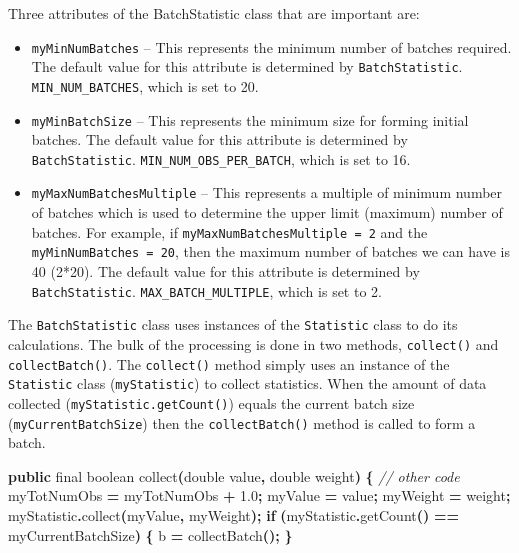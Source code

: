 \documentclass[
]{book}
\newenvironment{Shaded}{\begin{snugshade}}{\end{snugshade}}
\newcommand{\CommentTok}[1]{\textcolor[rgb]{0.56,0.35,0.01}{\textit{#1}}}
\newcommand{\ControlFlowTok}[1]{\textcolor[rgb]{0.13,0.29,0.53}{\textbf{#1}}}
\newcommand{\DataTypeTok}[1]{\textcolor[rgb]{0.13,0.29,0.53}{#1}}
\newcommand{\FloatTok}[1]{\textcolor[rgb]{0.00,0.00,0.81}{#1}}
\newcommand{\FunctionTok}[1]{\textcolor[rgb]{0.00,0.00,0.00}{#1}}
\newcommand{\KeywordTok}[1]{\textcolor[rgb]{0.13,0.29,0.53}{\textbf{#1}}}
\newcommand{\NormalTok}[1]{#1}
\newcommand{\OperatorTok}[1]{\textcolor[rgb]{0.81,0.36,0.00}{\textbf{#1}}}
\providecommand{\tightlist}{%
  \setlength{\itemsep}{0pt}\setlength{\parskip}{0pt}}
\theoremstyle{definition}
\theoremstyle{definition}
\theoremstyle{definition}
\theoremstyle{definition}
\theoremstyle{remark}
\begin{document}
Three attributes of the BatchStatistic class that are important are:

\begin{itemize}
\tightlist
\item
  \texttt{myMinNumBatches} -- This represents the minimum number of batches required. The default value for this attribute is determined by \texttt{BatchStatistic}. \texttt{MIN\_NUM\_BATCHES}, which is set to 20.
\item
  \texttt{myMinBatchSize} -- This represents the minimum size for forming initial batches. The default value for this attribute is determined by \texttt{BatchStatistic}. \texttt{MIN\_NUM\_OBS\_PER\_BATCH}, which is set to 16.
\item
  \texttt{myMaxNumBatchesMultiple} -- This represents a multiple of minimum number of batches which is used to determine the upper limit (maximum) number of batches. For example, if \texttt{myMaxNumBatchesMultiple\ =\ 2} and the \texttt{myMinNumBatches\ =\ 20}, then the maximum number of batches we can have is 40 (2*20). The default value for this attribute is determined by \texttt{BatchStatistic}. \texttt{MAX\_BATCH\_MULTIPLE}, which is set to 2.
\end{itemize}

The \texttt{BatchStatistic} class uses instances of the \texttt{Statistic} class to do its calculations. The bulk of the processing is done in two methods, \texttt{collect()} and \texttt{collectBatch()}. The \texttt{collect()} method simply uses an instance of the \texttt{Statistic} class (\texttt{myStatistic}) to collect statistics. When the amount of data collected (\texttt{myStatistic.getCount()}) equals the current batch size (\texttt{myCurrentBatchSize}) then the \texttt{collectBatch()} method is called to form a batch.

\begin{Shaded}
\begin{Highlighting}[]
\KeywordTok{public} \DataTypeTok{final} \DataTypeTok{boolean} \FunctionTok{collect}\OperatorTok{(}\DataTypeTok{double}\NormalTok{ value}\OperatorTok{,} \DataTypeTok{double}\NormalTok{ weight}\OperatorTok{)} \OperatorTok{\{}
\CommentTok{// other code}
\NormalTok{myTotNumObs }\OperatorTok{=}\NormalTok{ myTotNumObs }\OperatorTok{+} \FloatTok{1.0}\OperatorTok{;}
\NormalTok{myValue }\OperatorTok{=}\NormalTok{ value}\OperatorTok{;}
\NormalTok{myWeight }\OperatorTok{=}\NormalTok{ weight}\OperatorTok{;}
\NormalTok{myStatistic}\OperatorTok{.}\FunctionTok{collect}\OperatorTok{(}\NormalTok{myValue}\OperatorTok{,}\NormalTok{ myWeight}\OperatorTok{);}
\ControlFlowTok{if} \OperatorTok{(}\NormalTok{myStatistic}\OperatorTok{.}\FunctionTok{getCount}\OperatorTok{()} \OperatorTok{==}\NormalTok{ myCurrentBatchSize}\OperatorTok{)} \OperatorTok{\{}
\NormalTok{   b }\OperatorTok{=} \FunctionTok{collectBatch}\OperatorTok{();}
\OperatorTok{\}}
\end{Highlighting}
\end{Shaded}
\end{document}
